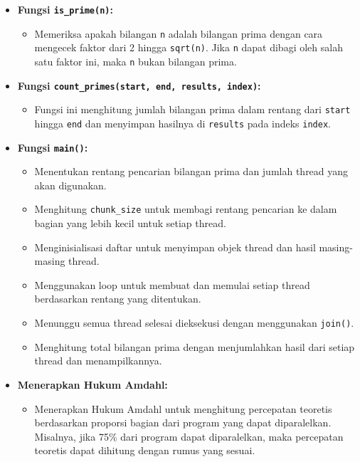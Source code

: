 \documentclass[12pt]{article}
\begin{document}
\begin{enumerate}
\begin{itemize}
    \item \textbf{Fungsi \texttt{is\_prime(n)}:}
    \begin{itemize}
        \item Memeriksa apakah bilangan \texttt{n} adalah bilangan prima dengan cara mengecek faktor dari 2 hingga \texttt{sqrt(n)}. Jika \texttt{n} dapat dibagi oleh salah satu faktor ini, maka \texttt{n} bukan bilangan prima.
    \end{itemize}

    \item \textbf{Fungsi \texttt{count\_primes(start, end, results, index)}:}
    \begin{itemize}
        \item Fungsi ini menghitung jumlah bilangan prima dalam rentang dari \texttt{start} hingga \texttt{end} dan menyimpan hasilnya di \texttt{results} pada indeks \texttt{index}.
    \end{itemize}

    \item \textbf{Fungsi \texttt{main()}:}
    \begin{itemize}
        \item Menentukan rentang pencarian bilangan prima dan jumlah thread yang akan digunakan.
        \item Menghitung \texttt{chunk\_size} untuk membagi rentang pencarian ke dalam bagian yang lebih kecil untuk setiap thread.
        \item Menginisialisasi daftar untuk menyimpan objek thread dan hasil masing-masing thread.
        \item Menggunakan loop untuk membuat dan memulai setiap thread berdasarkan rentang yang ditentukan.
        \item Menunggu semua thread selesai dieksekusi dengan menggunakan \texttt{join()}.
        \item Menghitung total bilangan prima dengan menjumlahkan hasil dari setiap thread dan menampilkannya.
    \end{itemize}

    \item \textbf{Menerapkan Hukum Amdahl:}
    \begin{itemize}
        \item Menerapkan Hukum Amdahl untuk menghitung percepatan teoretis berdasarkan proporsi bagian dari program yang dapat diparalelkan. Misalnya, jika 75\% dari program dapat diparalelkan, maka percepatan teoretis dapat dihitung dengan rumus yang sesuai.
    \end{itemize}
    \end{itemize}
\end{enumerate}
\end{document}
